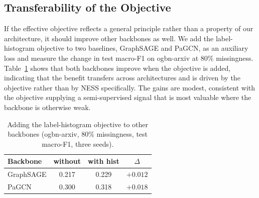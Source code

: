\subsection{Transferability of the Objective}
\label{sec:exp-transfer}

If the effective objective reflects a general principle rather than a property of our architecture, it should improve other backbones as well. We add the label-histogram objective to two baselines, GraphSAGE and PaGCN, as an auxiliary loss and measure the change in test macro-F1 on ogbn-arxiv at $80\%$ missingness. Table~\ref{tab:transfer} shows that both backbones improve when the objective is added, indicating that the benefit transfers across architectures and is driven by the objective rather than by NESS specifically. The gains are modest, consistent with the objective supplying a semi-supervised signal that is most valuable where the backbone is otherwise weak.

\begin{table}[t]
\centering
\caption{Adding the label-histogram objective to other backbones (ogbn-arxiv, $80\%$ missingness, test macro-F1, three seeds).}
\label{tab:transfer}
\small
\begin{tabular}{@{}lccc@{}}
\toprule
\textbf{Backbone} & \textbf{without} & \textbf{with hist} & \textbf{$\Delta$} \\
\midrule
GraphSAGE & 0.217 & 0.229 & $+0.012$ \\
PaGCN     & 0.300 & 0.318 & $+0.018$ \\
\bottomrule
\end{tabular}
\end{table}
